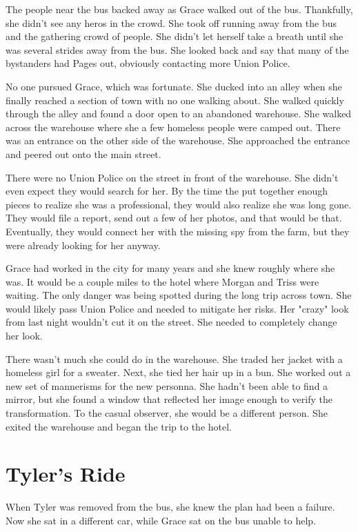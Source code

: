 \documentclass[courier]{sffms}
\begin{document}
The people near the bus backed away as Grace walked out
of the bus. Thankfully, she didn't see any heros in the crowd.
She took off running away from the bus and the gathering
crowd of people. She didn't let herself take a breath until
she was several strides away from the bus. She looked back
and say that many of the bystanders had Pages out, obviously
contacting more Union Police.

No one pursued Grace, which was fortunate. She ducked into
an alley when she finally reached a section of town with no one
walking about. She walked quickly through the alley and found
a door open to an abandoned warehouse. She walked
across the warehouse where she a few homeless people were
camped out. There was an entrance on the other side of the
warehouse. She approached the entrance and peered out onto
the main street.

There were no Union Police on the street in front of the
warehouse. She didn't even expect they would search for
her. By the time the put together enough pieces to realize
she was a professional, they would also realize she was
long gone. They would file a report, send out a few of her
photos, and that would be that. Eventually, they would
connect her with the missing spy from the farm, but they
were already looking for her anyway.

Grace had worked in the city for many years and she knew
roughly where she was. It would be a couple miles to the
hotel where Morgan and Triss were waiting. The only danger
was being spotted during the long trip across town. She
would likely pass Union Police and needed to mitigate her
risks. Her "crazy" look from last night wouldn't cut it on the
street. She needed to completely change her look.

There wasn't much she could do in the warehouse. She
traded her jacket with a homeless girl for a sweater. Next,
she tied her hair up in a bun. She worked out a new
set of mannerisms for the new personna. She hadn't 
been able to find a mirror, but she found a window that
reflected her image enough to verify the transformation.
To the casual observer, she would be a different person.
She exited the warehouse and began the trip to the
hotel.

\chapter{Tyler's Ride}
When Tyler was removed from the bus, she knew the
plan had been a failure. Now she sat in a different
car, while Grace sat on the bus unable to help.
\end{document}
